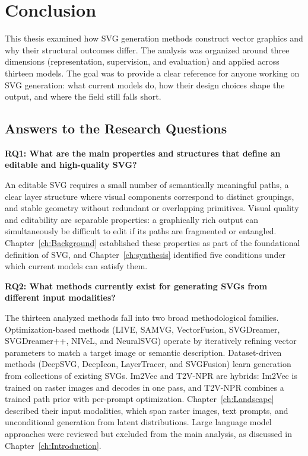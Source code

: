 \chapter{Conclusion}
\label{ch:Conclusion}

This thesis examined how SVG generation methods construct 
vector graphics and why their structural outcomes differ. 
The analysis was organized around three dimensions 
(representation, supervision, and evaluation) and applied 
across thirteen models. The goal was to provide 
a clear reference for anyone working on SVG generation: 
what current models do, how their design choices shape 
the output, and where the field still falls short.

\section{Answers to the Research Questions}

\textbf{RQ1: What are the main properties and structures 
that define an editable and high-quality SVG?}

An editable SVG requires a small number of semantically 
meaningful paths, a clear layer structure where visual 
components correspond to distinct groupings, and stable 
geometry without redundant or overlapping primitives. 
Visual quality and editability are separable properties: 
a graphically rich output can simultaneously be difficult 
to edit if its paths are fragmented or entangled. 
Chapter~\ref{ch:Background} established these properties 
as part of the foundational definition of SVG, and 
Chapter~\ref{ch:synthesis} identified five conditions 
under which current models can satisfy them.

\textbf{RQ2: What methods currently exist 
for generating SVGs from different input modalities?}

The thirteen analyzed methods fall into two broad 
methodological families. 
Optimization-based methods (LIVE, SAMVG, 
VectorFusion, SVGDreamer, SVGDreamer++, NIVeL, and 
NeuralSVG) operate by iteratively refining vector 
parameters to match a target image or semantic 
description. Dataset-driven methods (DeepSVG, DeepIcon, 
LayerTracer, and SVGFusion) learn generation 
from collections of existing SVGs. Im2Vec and T2V-NPR 
are hybrids: Im2Vec is trained on raster images and 
decodes in one pass, and T2V-NPR combines a trained 
path prior with per-prompt optimization. 
Chapter~\ref{ch:Landscape} described their input 
modalities, which span raster images, text prompts, 
and unconditional generation from latent distributions. 
Large language model approaches were reviewed but 
excluded from the main analysis, as discussed in 
Chapter~\ref{ch:Introduction}.

